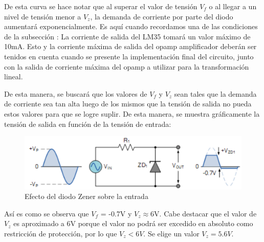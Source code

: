 \documentclass[../../main.tex]{subfiles}
\begin{document}
De esta curva se hace notar que al superar el valor de tensión $V_f$ o al llegar a un nivel de tensión menor a $V_z$, la demanda de corriente por parte del diodo aumentará exponencialmente. Es aquí cuando recordamos una de las condiciones de la subsección : La corriente de salida del LM35 tomará un valor máximo de 10mA. Esto y la corriente máxima de salida del opamp amplificador deberán ser tenidos en cuenta cuando se presente la implementación final del circuito, junto con la salida de corriente máxima del opamp a utilizar para la transformación lineal.\par
De esta manera, se buscará que los valores de $V_f$ y $V_z$ sean tales que la demanda de corriente sea tan alta luego de los mismos que la tensión de salida no pueda estos valores para que se logre suplir. De esta manera, se muestra gráficamente la tensión de salida en función de la tensión de entrada:

\begin{figure}[H]	%
	\centering
	\includegraphics[scale=0.5]{imagenes/zener_diode_efecto.png}
	\caption{Efecto del diodo Zener sobre la entrada}
	\label{fig:ej6_zener_diode_efecto}
\end{figure}

Así es como se observa que $V_f$ = -0.7V y $V_z$$\approx$6V. Cabe destacar que el valor de $V_z$ es aproximado a 6V porque el valor no podrá ser excedido en absoluto como restricción de protección, por lo que $V_z<6V$. Se elige un valor $V_z= 5.6V$.
\end{document}
